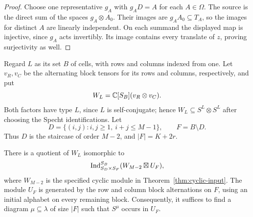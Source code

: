 \begin{proof}
Choose one representative $g_A$ with $g_AD=A$ for each $A\in\Omega$.
The source is the direct sum of the spaces $g_A\otimes A_0$.
Their images are $g_AA_0\subseteq T_A$, so the images for distinct
$A$ are linearly independent.  On each summand the displayed map is
injective, since $g_A$ acts invertibly.  Its image contains every
translate of $z$, proving surjectivity as well.
\end{proof}

Regard $L$ as its set $B$ of cells, with rows and columns indexed from
one.  Let $v_R,v_C$ be the alternating block tensors for its rows and
columns, respectively, and put
\[
 W_L=\mathbb C[S_B](v_R\otimes v_C).
\]
Both factors have type $L$, since $L$ is self-conjugate; hence
$W_L\subseteq S^L\otimes S^L$ after choosing the Specht
identifications.  Let
\[
 D=\{(i,j):i,j\ge1,\ i+j\le M-1\},\qquad F=B\setminus D.
\]
Thus $D$ is the staircase of order $M-2$, and
$|F|=K+2r$.

\begin{lemma}\label{band:triangle-quotient}
There is a quotient of $W_L$ isomorphic to
\begin{equation}\label{eq:band-triangle-quotient}
 \operatorname{Ind}_{S_D\times S_F}^{S_B}
       (W_{M-2}\boxtimes U_F),
\end{equation}
where $W_{M-2}$ is the specified cyclic module in
Theorem~\ref{thm:cyclic-input}.  The module $U_F$ is generated by
the row and column block alternations on $F$, using an initial
alphabet on every remaining block.
Consequently, it suffices to find a diagram $\mu\subseteq\lambda$
of size $|F|$ such that $S^\mu$ occurs in $U_F$.
\end{lemma}

